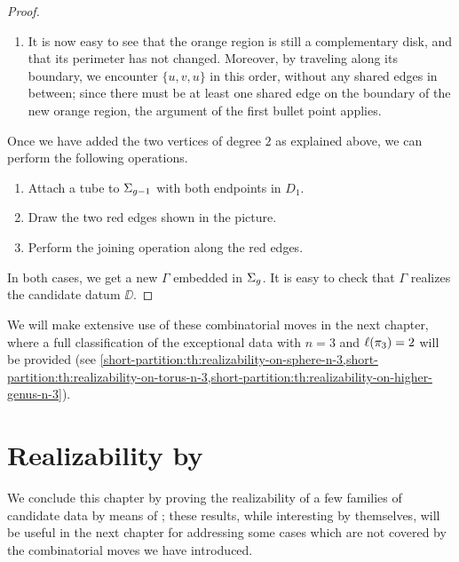 \begin{proof}
\begin{itemize}
\begin{enumerate}[(1)]
\item It is now easy to see that the orange region is still a complementary disk, and that its perimeter has not changed. Moreover, by traveling along its boundary, we encounter $\{u,v,u\}$ in this order, without any shared edges in between; since there must be at least one shared edge on the boundary of the new orange region, the argument of the first bullet point applies.
\end{enumerate}

Once we have added the two vertices of degree $2$ as explained above, we can perform the following operations.
\begin{enumerate}[(1)]
\item Attach a tube to $\Sigma_{g-1}$ with both endpoints in $D_1$.
\item Draw the two red edges shown in the picture.
\item Perform the joining operation along the red edges.
\end{enumerate}
\end{itemize}

In both cases, we get a new \dessin{} $\Gamma$ embedded in $\Sigma_{g}$. It is easy to check that $\Gamma$ realizes the candidate datum $\DD$.
\end{proof}

We will make extensive use of these combinatorial moves in the next chapter, where a full classification of the exceptional data with $n=3$ and $\ell(\pi_3)=2$ will be provided (see \cref{short-partition:th:realizability-on-sphere-n-3,short-partition:th:realizability-on-torus-n-3,short-partition:th:realizability-on-higher-genus-n-3}).

\section{Realizability by \texorpdfstring{\dessins{}}{dessins d'enfant}}

We conclude this chapter by proving the realizability of a few families of candidate data by means of \dessins{}; these results, while interesting by themselves, will be useful in the next chapter for addressing some cases which are not covered by the combinatorial moves we have introduced.

